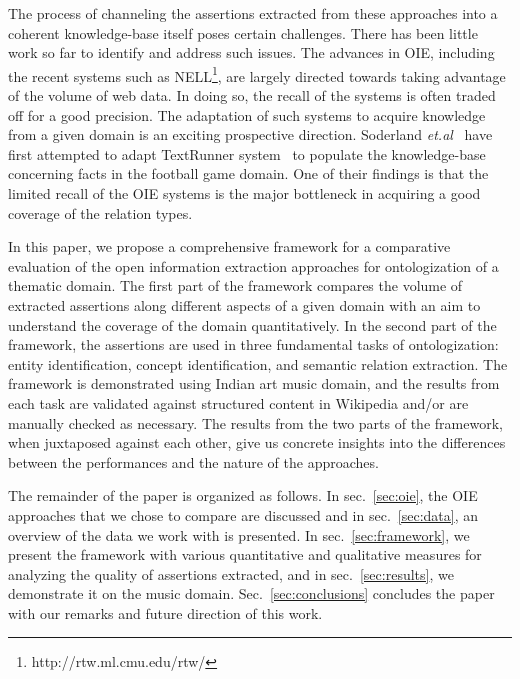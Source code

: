 \documentclass{llncs}
\begin{document}
The process of channeling the assertions extracted from these approaches into a coherent knowledge-base itself poses certain challenges. There has been little work so far to identify and address such issues. The advances in OIE, including the recent systems such as NELL\footnote{http://rtw.ml.cmu.edu/rtw/}, are largely directed towards taking advantage of the volume of web data. In doing so, the recall of the systems is often traded off for a good precision. The adaptation of such systems to acquire knowledge from a given domain is an exciting prospective direction. Soderland \textit{et.al}~\cite{Soderland2010} have first attempted to adapt TextRunner system~\cite{Etzioni2008a} to populate the knowledge-base concerning facts in the football game domain. One of their findings is that the limited recall of the OIE systems is the major bottleneck in acquiring a good coverage of the relation types.

In this paper, we propose a comprehensive framework for a comparative evaluation of the open information extraction approaches for ontologization of a thematic domain. The first part of the framework compares the volume of extracted assertions along different aspects of a given domain with an aim to understand the coverage of the domain quantitatively. In the second part of the framework, the assertions are used in three fundamental tasks of ontologization: entity identification, concept identification, and semantic relation extraction. The framework is demonstrated using Indian art music domain, and the results from each task are validated against structured content in Wikipedia and/or are manually checked as necessary. The results from the two parts of the framework, when juxtaposed against each other, give us concrete insights into the differences between the performances and the nature of the approaches.

The remainder of the paper is organized as follows. In sec.~\ref{sec:oie}, the OIE approaches that we chose to compare are discussed and in sec.~\ref{sec:data},  an overview of the data we work with is presented. In sec.~\ref{sec:framework}, we present the framework with various quantitative and qualitative measures for analyzing the quality of assertions extracted, and in sec.~\ref{sec:results}, we demonstrate it on the music domain. Sec.~\ref{sec:conclusions} concludes the paper with our remarks and future direction of this work.
\end{document}
